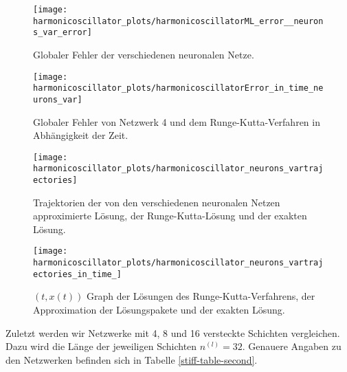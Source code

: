 \begin{figure}
       \centering
       \texttt{[image: harmonicoscillator\_plots/harmonicoscillatorML\_error\_\_neurons\_var\_error]}
       \caption{Globaler Fehler der verschiedenen neuronalen Netze.}
       \label{fig:harmonic-neurons-variable-error}
\end{figure}
\begin{figure}
       \centering
       \texttt{[image: harmonicoscillator\_plots/harmonicoscillatorError\_in\_time\_neurons\_var]}
       \caption{Globaler Fehler von Netzwerk 4 und dem Runge-Kutta-Verfahren in Abhängigkeit der Zeit.}
       \label{fig:harmonic-neurons-variable-error-in-time}
\end{figure}
\begin{figure}
       \centering
       \texttt{[image: harmonicoscillator\_plots/harmonicoscillator\_neurons\_vartrajectories]}
       \caption{Trajektorien der von den verschiedenen neuronalen Netzen approximierte Lösung, der Runge-Kutta-Lösung
       und der exakten Lösung.}
       \label{fig:harmonic-neurons-variable-trajectories}
\end{figure}
\begin{figure}
       \centering
       \texttt{[image: harmonicoscillator\_plots/harmonicoscillator\_neurons\_vartrajectories\_in\_time\_]}
       \caption{$(t,x(t))$ Graph der Lösungen des Runge-Kutta-Verfahrens, der Approximation der
       Lösungspakete und der exakten Lösung.}
       \label{fig:harmonic-neurons-variable-trajectories-in-time}
\end{figure}
Zuletzt werden wir Netzwerke mit 4, 8 und 16 versteckte Schichten vergleichen. Dazu wird die Länge der jeweiligen
Schichten $n^{(l)}=32$. Genauere Angaben zu den Netzwerken befinden sich in Tabelle \ref{stiff-table-second}.
